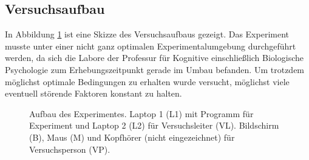 \documentclass[doc,a4paper,12pt]{apa6}
\begin{document}
\subsection{Versuchsaufbau}

In Abbildung \ref{experiment} ist eine Skizze des Versuchsaufbaus gezeigt. Das Experiment musste unter einer nicht ganz optimalen Experimentalumgebung durchgeführt werden, da sich die Labore der Professur für Kognitive einschließlich Biologische Psychologie zum Erhebungszeitpunkt gerade im Umbau befanden. Um trotzdem möglichst optimale Bedingungen zu erhalten wurde versucht, möglichst viele eventuell störende Faktoren konstant zu halten.

\newpage

\begin{figure}
  \centering
  \begin{minipage}{.55\textwidth}
    \setlength{\fboxsep}{.05\textwidth}
    \vspace{10pt}
    \caption{Aufbau des Experimentes. Laptop 1 (L1) mit Programm für Experiment und Laptop 2 (L2) für Versuchsleiter (VL). Bildschirm (B), Maus (M) und Kopfhörer (nicht eingezeichnet) für Versuchsperson (VP).}
    \label{experiment}
  \end{minipage}
\end{figure}
\end{document}
